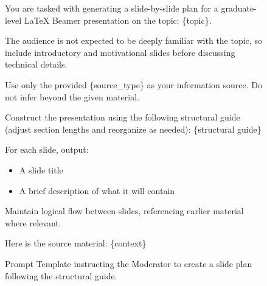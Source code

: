\documentclass[letterpaper]{article} %
\begin{document}
\begin{figure}
\begin{tcolorbox}[colback=gray!10, colframe=black!90, title=Moderator: Slide Plan Creation Prompt Template]
You are tasked with generating a slide-by-slide plan for a graduate-level LaTeX Beamer presentation on the topic: \{topic\}.

The audience is not expected to be deeply familiar with the topic, so include introductory and motivational slides before discussing technical details.

Use only the provided \{source\_type\} as your information source. Do not infer beyond the given material.

Construct the presentation using the following structural guide (adjust section lengths and reorganize as needed):  
\{structural guide\}

For each slide, output:
\begin{itemize}
    \item A slide title
    \item A brief description of what it will contain
\end{itemize}

Maintain logical flow between slides, referencing earlier material where relevant.

Here is the source material:  
\{context\}
\end{tcolorbox}
\caption{Prompt Template instructing the Moderator to create a slide plan following the structural guide.}
\label{fig:mod_plan_prompt}
\end{figure}
\end{document}

